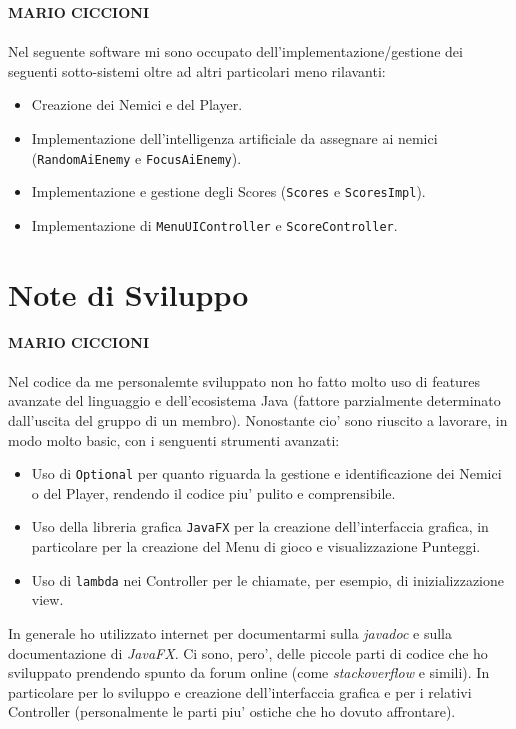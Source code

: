 \documentclass[a4paper,12pt]{report}
\begin{document}
\textbf{MARIO CICCIONI}
\\ \\
Nel seguente software mi sono occupato dell'implementazione/gestione dei seguenti sotto-sistemi oltre ad altri particolari meno rilavanti:
\begin{itemize}
    \item Creazione dei Nemici e del Player.
    \item Implementazione dell'intelligenza artificiale da assegnare ai nemici (\verb|RandomAiEnemy| e \verb|FocusAiEnemy|).
    \item Implementazione e gestione degli Scores (\verb|Scores| e \verb|ScoresImpl|).
    \item Implementazione di \verb|MenuUIController| e \verb|ScoreController|. 
\end{itemize}
\section{Note di Sviluppo}
\textbf{MARIO CICCIONI}
\\ \\
Nel codice da me personalemte sviluppato non ho fatto molto uso di features avanzate del linguaggio e dell'ecosistema Java (fattore parzialmente determinato dall'uscita del gruppo di un membro). 
Nonostante cio' sono riuscito a lavorare, in modo molto basic, con i senguenti strumenti avanzati:
\begin{itemize}
    \item Uso di \verb|Optional| per quanto riguarda la gestione e identificazione dei Nemici o del Player, rendendo il codice piu' pulito e comprensibile.
    \item Uso della libreria grafica \verb|JavaFX| per la creazione dell'interfaccia grafica, in particolare per la creazione del Menu di gioco e visualizzazione Punteggi.
    \item Uso di \verb|lambda| nei Controller per le chiamate, per esempio, di inizializzazione view.
\end{itemize}
In generale ho utilizzato internet per documentarmi sulla \textit{javadoc} e sulla documentazione di \textit{JavaFX}. Ci sono, pero', delle piccole parti di codice che ho sviluppato prendendo spunto da forum online (come \textit{stackoverflow} e simili). In particolare per lo sviluppo e creazione dell'interfaccia grafica e per i relativi Controller (personalmente le parti piu' ostiche che ho dovuto affrontare).
\\ \\
\end{document}
